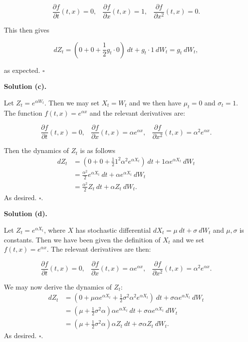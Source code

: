 \documentclass[a4paper,12pt,openany]{book}
\begin{document}
\[
\frac{\partial f}{\partial t}(t,x)=0,\hspace{10pt}\frac{\partial f}{\partial x}(t,x) =1,\hspace{10pt}\frac{\partial f}{\partial x^2}(t,x) =0.
\]

This then gives

\[
dZ_t=\left(0+0+\frac{1}{2}g_t\cdot 0\right)\ dt + g_t\cdot 1\ dW_t=g_t\ dW_t,
\]

as expected. \(\square\)

\textbf{Solution (c).}

Let \(Z_t=e^{\alpha W_t}\). Then we may set \(X_t=W_t\) and we then have \(\mu_t=0\) and \(\sigma_t=1\). The function \(f(t,x)=e^{\alpha x}\) and the relevant derivatives are:

\[
\frac{\partial f}{\partial t}(t,x)=0,\hspace{10pt}\frac{\partial f}{\partial x}(t,x) =\alpha e^{\alpha x},\hspace{10pt}\frac{\partial f}{\partial x^2}(t,x) =\alpha^2 e^{\alpha x}.
\]

Then the dynamics of \(Z_t\) is as follows
\begin{align*}
dZ_t&=\left(0+0+\frac{1}{2}1^2\alpha^2e^{\alpha X_t}\right)\ dt + 1\alpha e^{\alpha X_t}\ dW_t\\
&=\frac{\alpha^2}{2}e^{\alpha X_t}\ dt +\alpha e^{\alpha X_t}\ dW_t\\
&=\frac{\alpha^2}{2}Z_t\ dt +\alpha Z_t\ dW_t.
\end{align*}
As desired. \(\square\).

\textbf{Solution (d).}

Let \(Z_t=e^{\alpha X_t}\), where \(X\) has stochastic differential \(dX_t=\mu\ dt + \sigma\ dW_t\) and \(\mu,\sigma\) is constants. Then we have been given the definition of \(X_t\) and we set \(f(t,x)=e^{\alpha x}\). The relevant derivatives are then:

\[
\frac{\partial f}{\partial t}(t,x)=0,\hspace{10pt}\frac{\partial f}{\partial x}(t,x) =\alpha e^{\alpha x},\hspace{10pt}\frac{\partial f}{\partial x^2}(t,x) =\alpha^2 e^{\alpha x}.
\]

We may now derive the dynamics of \(Z_t\):
\begin{align*}
dZ_t&=\left(0+\mu \alpha e^{\alpha X_t}+\frac{1}{2} \sigma^2\alpha^2 e^{\alpha X_t}\right)\ dt+\sigma \alpha e^{\alpha X_t}\ dW_t\\
&=\left(\mu+\frac{1}{2}\sigma^2\alpha\right)\alpha e^{\alpha X_t}\ dt+\sigma \alpha e^{\alpha X_t}\ dW_t\\
&=\left(\mu+\frac{1}{2}\sigma^2\alpha\right)\alpha Z_t\ dt+\sigma \alpha Z_t\ dW_t.
\end{align*}
As desired. \(\square\).
\end{document}
